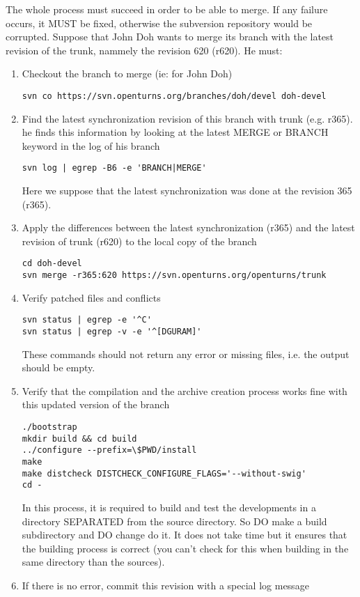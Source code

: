 \documentclass[11pt]{article}
\begin{document}
The whole process must succeed in order to be able to merge. If any failure occurs, it MUST be fixed, otherwise the subversion repository would be corrupted. Suppose that John Doh wants to merge its branch with the latest revision of the trunk, nammely the revision 620 (r620). He must:
\begin{enumerate}
\item Checkout the branch to merge (ie: for John Doh)

\begin{verbatim}
svn co https://svn.openturns.org/branches/doh/devel doh-devel
\end{verbatim}

\item Find the latest synchronization revision of this branch with trunk (e.g. r365). he finds this information by looking at the latest MERGE or BRANCH keyword in the log of his branch
\begin{verbatim}
svn log | egrep -B6 -e 'BRANCH|MERGE'
\end{verbatim}

  Here we suppose that the latest synchronization was done at the revision 365 (r365).
\item Apply the differences between the latest synchronization (r365) and the latest revision of trunk (r620) to the local copy of the branch

\begin{verbatim}
cd doh-devel
svn merge -r365:620 https://svn.openturns.org/openturns/trunk
\end{verbatim}

\item Verify patched files and conflicts

\begin{verbatim}
svn status | egrep -e '^C'
svn status | egrep -v -e '^[DGURAM]'
\end{verbatim}

  These commands should not return any error or missing files, i.e. the output should be empty.
\item Verify that the compilation and the archive creation process works fine with this updated version of the branch

\begin{verbatim}
./bootstrap
mkdir build && cd build
../configure --prefix=\$PWD/install
make
make distcheck DISTCHECK_CONFIGURE_FLAGS='--without-swig'
cd -
\end{verbatim}

  In this process, it is required to build and test the developments in a directory SEPARATED from the source directory. So DO make a build subdirectory and DO change do it. It does not take time but it ensures that the building process is correct (you can't check for this when building in the same directory than the sources).
\item If there is no error, commit this revision with a special log message


\end{enumerate}
\end{document}
